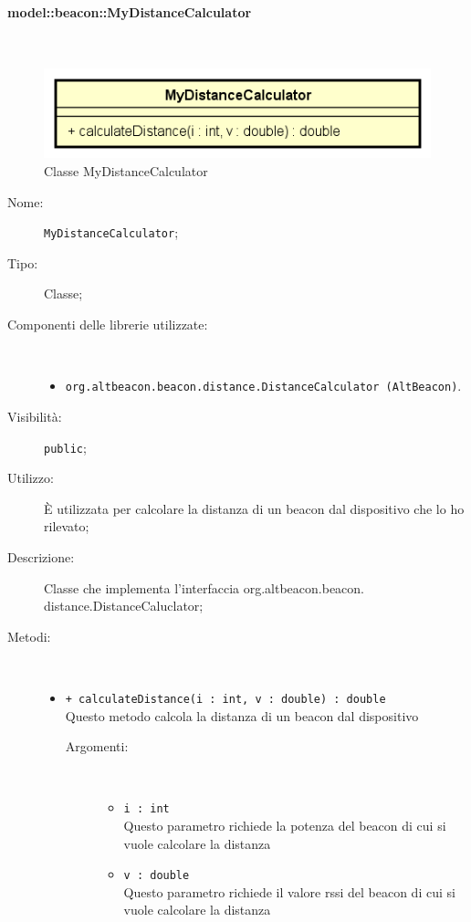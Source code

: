 \documentclass[../DefinizioneDiProdotto.tex]{subfiles}
\begin{document}
\paragraph{model::beacon::MyDistanceCalculator}
\
\begin{figure}[H]
	\centering
	\includegraphics[width=\maxwidth]{img/MyDistanceCalculator.png}
	\caption{Classe MyDistanceCalculator}\label{fig:model::beacon::MyDistanceCalculator} 
\end{figure}
\begin{description}
	\item[Nome:] \texttt{MyDistanceCalculator};
	\item[Tipo:] Classe;
	\item[Componenti delle librerie utilizzate:] \
	\begin{itemize}
		\item \texttt{org.altbeacon.beacon.distance.DistanceCalculator (AltBeacon)}.
		
	\end{itemize}
	\item[Visibilità:] \texttt{public};
	\item[Utilizzo:] È utilizzata per calcolare la distanza di un beacon dal dispositivo che lo ho rilevato;
	\item[Descrizione:] Classe che implementa l'interfaccia org.altbeacon.beacon.\\
	distance.DistanceCaluclator;
	\item[Metodi:] \
	\begin{itemize}
		\item \texttt{+ calculateDistance(i : int, v : double) : double}\\
		Questo metodo calcola la distanza di un beacon dal dispositivo
		\begin{description}
			\item[Argomenti:] \
			\begin{itemize}
				\item \texttt{i : int}\\
				Questo parametro richiede la potenza del beacon di cui si vuole calcolare la distanza\item \texttt{v : double}\\
				Questo parametro richiede il valore rssi del beacon di cui si vuole calcolare la distanza\end{itemize}
		\end{description}
	\end{itemize}
\end{description}
\end{document}
